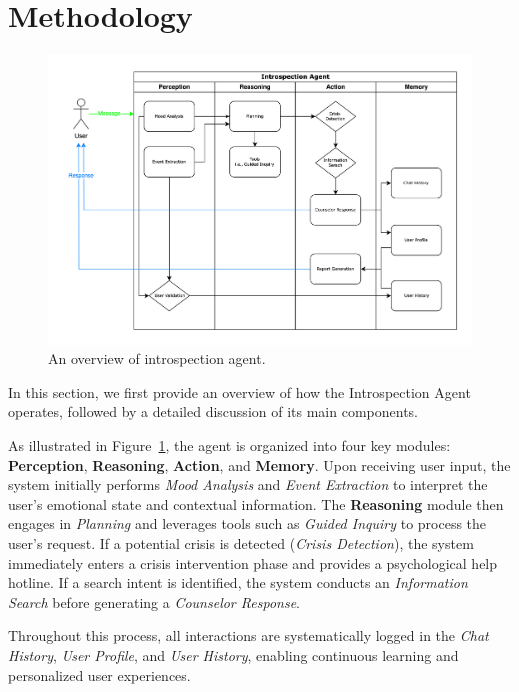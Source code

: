 \section{Methodology}
\label{sec:methodology}

\begin{figure}[t]
  \includegraphics[width=\columnwidth]{figs/introspection-agent.png}
  \caption{An overview of introspection agent.}
  \label{fig:introspection-agent}
\end{figure}

In this section, we first provide an overview of how the Introspection Agent operates, followed by a detailed discussion of its main components.

As illustrated in Figure~\ref{fig:introspection-agent}, the agent is organized into four key modules: \textbf{Perception}, \textbf{Reasoning}, \textbf{Action}, and \textbf{Memory}. Upon receiving user input, the system initially performs \textit{Mood Analysis} and \textit{Event Extraction} to interpret the user's emotional state and contextual information. The \textbf{Reasoning} module then engages in \textit{Planning} and leverages tools such as \textit{Guided Inquiry} to process the user's request. If a potential crisis is detected (\textit{Crisis Detection}), the system immediately enters a crisis intervention phase and provides a psychological help hotline. If a search intent is identified, the system conducts an \textit{Information Search} before generating a \textit{Counselor Response}. 

Throughout this process, all interactions are systematically logged in the \textit{Chat History}, \textit{User Profile}, and \textit{User History}, enabling continuous learning and personalized user experiences.

